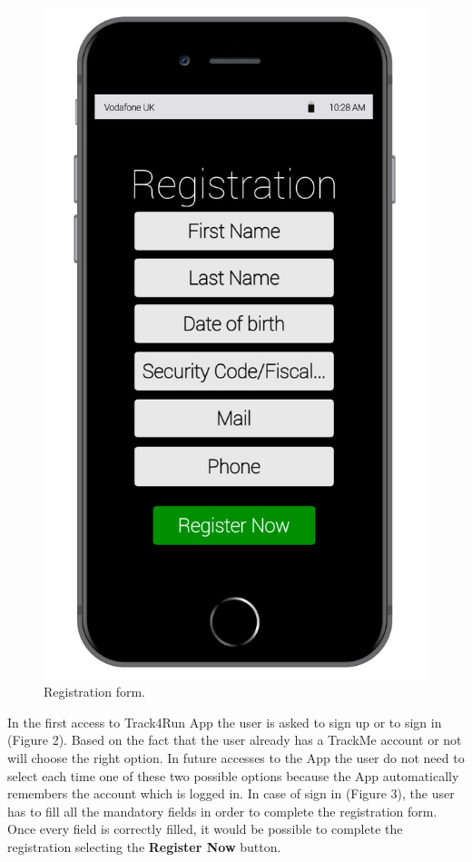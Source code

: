 \begin{enumerate}
\begin{figure}[H]
\begin{center}
\begin{minipage}[c]{.40\textwidth}
          \includegraphics[height=14 cm]{Images/Mockups/Track4RunMockup4.jpg}
	\caption{Registration form.}
        \end{minipage}
      \end{center}
\end{figure}
In the first access to Track4Run App the user is asked to sign up or to sign in 			(Figure 2). Based on the fact that the user already has a TrackMe account or not will choose the right option. In future accesses to the App the user do not need to select each time one of these two possible options because the App automatically remembers the account which is logged in. In case of sign in (Figure 3), the user has to fill all the mandatory fields in order to complete the registration form. Once every field is correctly filled, it would be possible to complete the registration selecting the \textbf{Register Now} button. 
\clearpage
\begin{figure}[H]
\begin{center}
        \begin{minipage}[c]{.40\textwidth}
        \centering

\end{minipage}
\end{center}
\end{figure}
\end{enumerate}
